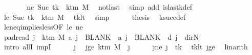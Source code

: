 \begin{isabellebody}
\ {\isacharminus}{\kern0pt}\isanewline
\ \ \ \ \isamarkupfalse%
\ ne{\isacharcolon}{\kern0pt}\ {\isachardoublequoteopen}Suc\ tk\ {\isasymnoteq}\ k{\isacharunderscore}{\kern0pt}tm\ M{\isachardoublequoteclose}\ \isamarkupfalse%
\ notlast\ \isamarkupfalse%
\ {\isacharparenleft}{\kern0pt}simp\ add{\isacharcolon}{\kern0pt}\ is{\isacharunderscore}{\kern0pt}last{\isacharunderscore}{\kern0pt}k{\isacharunderscore}{\kern0pt}def{\isacharparenright}{\kern0pt}\isanewline
\ \ \ \ \isamarkupfalse%
\ le{\isacharcolon}{\kern0pt}\ {\isachardoublequoteopen}Suc\ tk\ {\isasymle}\ k{\isacharunderscore}{\kern0pt}tm\ M{\isachardoublequoteclose}\ \isamarkupfalse%
\ tk{\isacharunderscore}{\kern0pt}lt\ \isamarkupfalse%
\ simp\isanewline
\ \ \ \ \isamarkupfalse%
\ {\isacharquery}{\kern0pt}thesis\ \isamarkupfalse%
\ k{\isacharunderscore}{\kern0pt}succ{\isacharunderscore}{\kern0pt}def\ \isamarkupfalse%
\ le{\isacharunderscore}{\kern0pt}neq{\isacharunderscore}{\kern0pt}implies{\isacharunderscore}{\kern0pt}less{\isacharbrackleft}{\kern0pt}OF\ le\ ne{\isacharbrackright}{\kern0pt}\ \isakeywordONE{{\isachardot}{\kern0pt}}\isamarkupfalse%
\isanewline
\ \ \isamarkupfalse%
\isanewline
\ \ \isamarkupfalse%
\ pad{\isacharunderscore}{\kern0pt}read{\isacharcolon}{\kern0pt}\ {\isachardoublequoteopen}{\isasymforall}j\ {\isasymge}\ k{\isacharunderscore}{\kern0pt}tm\ M{\isachardot}{\kern0pt}\ {\isacharquery}{\kern0pt}a\ j\ {\isacharequal}{\kern0pt}\ BLANK{}\ {\isasymand}\ {\isacharquery}{\kern0pt}a{\isacharprime}{\kern0pt}\ j\ {\isacharequal}{\kern0pt}\ BLANK{}\ {\isasymand}\ {\isacharquery}{\kern0pt}d\ j\ {\isacharequal}{\kern0pt}\ dir{\isachardot}{\kern0pt}N{\isachardoublequoteclose}\isanewline
\ \ \isamarkupfalse%
\ {\isacharparenleft}{\kern0pt}intro\ allI\ impI{\isacharparenright}{\kern0pt}\isanewline
\ \ \ \ \isamarkupfalse%
\ j\ \isamarkupfalse%
\ jge{\isacharcolon}{\kern0pt}\ {\isachardoublequoteopen}k{\isacharunderscore}{\kern0pt}tm\ M\ {\isasymle}\ j{\isachardoublequoteclose}\isanewline
\ \ \ \ \isamarkupfalse%
\ jne{\isacharcolon}{\kern0pt}\ {\isachardoublequoteopen}j\ {\isasymnoteq}\ tk{\isachardoublequoteclose}\ \isamarkupfalse%
\ tk{\isacharunderscore}{\kern0pt}lt\ jge\ \isamarkupfalse%
\ linarith\isanewline
\ \ \ \ \isamarkupfalse%

\end{isabellebody}
